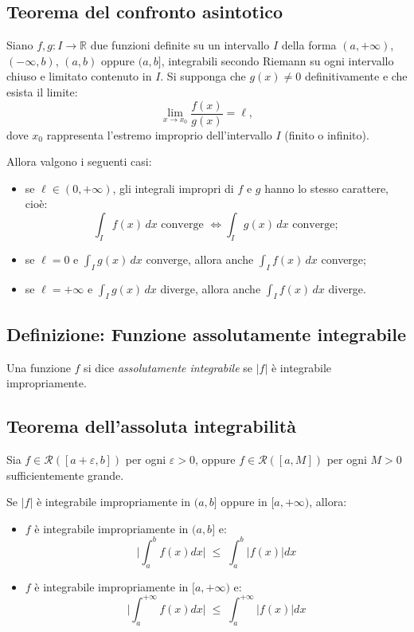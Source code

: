 \documentclass[a4paper,12pt,openright]{book}
\begin{document}
	\subsection{Teorema del confronto asintotico}
	Siano $f,g : I \longrightarrow \mathbb{R}$ due funzioni definite su un intervallo $I$ della forma $(a,+\infty)$, $(-\infty,b)$, $(a,b)$ oppure $(a,b]$, integrabili secondo Riemann su ogni intervallo chiuso e limitato contenuto in $I$. 
	Si supponga che $g(x) \neq 0$ definitivamente e che esista il limite:
	\[
	\lim_{x \to x_0} \frac{f(x)}{g(x)} = \ell,
	\]
	dove $x_0$ rappresenta l’estremo improprio dell’intervallo $I$ (finito o infinito).
	
	Allora valgono i seguenti casi:
	\begin{itemize}
		\item se $\ell \in (0,+\infty)$, gli integrali impropri di $f$ e $g$ hanno lo stesso carattere, cioè:
		\[
		\int_I f(x)\,dx \text{ converge } \Longleftrightarrow \int_I g(x)\,dx \text{ converge};
		\]
		
		\item se $\ell = 0$ e $\int_I g(x)\,dx$ converge, allora anche $\int_I f(x)\,dx$ converge;
		
		\item se $\ell = +\infty$ e $\int_I g(x)\,dx$ diverge, allora anche $\int_I f(x)\,dx$ diverge.
	\end{itemize}
	
	
	\subsection{Definizione: Funzione assolutamente integrabile}
	Una funzione $f$ si dice \emph{assolutamente integrabile} se $|f|$ è integrabile impropriamente.
	
	\subsection{Teorema dell'assoluta integrabilità}		
	Sia $f \in \mathcal{R}([a+\varepsilon,b])$ per ogni $\varepsilon>0$, oppure $f \in \mathcal{R}([a,M])$ per ogni $M>0$ sufficientemente grande. 
	
	Se $|f|$ è integrabile impropriamente in $(a,b]$ oppure in $[a,+\infty)$, allora:
	\begin{itemize}
		\item $f$ è integrabile impropriamente in $(a, b]$ e:
			\[\bigg|\int_a^{b} f(x)dx\bigg| \; \leq \; \int_a^{b} |f(x)|dx\]
		\item $f$ è integrabile impropriamente in $[a, +\infty)$ e:
			\[\bigg|\int_a^{+\infty} f(x)dx\bigg| \; \leq \; \int_a^{+\infty} |f(x)|dx\]
	\end{itemize}
	
\end{document}
